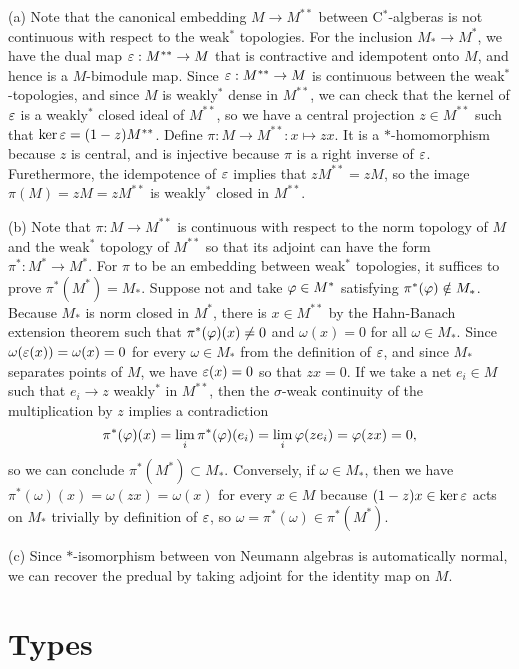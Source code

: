 \documentclass{../../large}
\begin{document}
\begin{pf}
(a)
Note that the canonical embedding $M\to M^{**}$ between C$^*$-algberas is not continuous with respect to the weak$^*$ topologies.
For the inclusion $M_*\to M^*$, we have the dual map $\varepsilon:M^{**}\to M$ that is contractive and idempotent onto $M$, and hence is a $M$-bimodule map.
Since $\varepsilon:M^{**}\to M$ is continuous between the weak$^*$-topologies, and since $M$ is weakly$^*$ dense in $M^{**}$, we can check that the kernel of $\varepsilon$ is a weakly$^*$ closed ideal of $M^{**}$, so we have a central projection $z\in M^{**}$ such that $\ker\varepsilon=(1-z)M^{**}$.
Define $\pi:M\to M^{**}:x\mapsto zx$.
It is a $*$-homomorphism because $z$ is central, and is injective because $\pi$ is a right inverse of $\varepsilon$.
Furethermore, the idempotence of $\varepsilon$ implies that $zM^{**}=zM$, so the image $\pi(M)=zM=zM^{**}$ is weakly$^*$ closed in $M^{**}$.

(b)
Note that $\pi:M\to M^{**}$ is continuous with respect to the norm topology of $M$ and the weak$^*$ topology of $M^{**}$ so that its adjoint can have the form $\pi^*:M^*\to M^*$.
For $\pi$ to be an embedding between weak$^*$ topologies, it suffices to prove $\pi^*(M^*)=M_*$.
Suppose not and take $\varphi\in M^*$ satisfying $\pi^*(\varphi)\notin M_*$.
Because $M_*$ is norm closed in $M^*$, there is $x\in M^{**}$ by the Hahn-Banach extension theorem such that $\pi^*(\varphi)(x)\ne0$ and $\omega(x)=0$ for all $\omega\in M_*$.
Since $\omega(\varepsilon(x))=\omega(x)=0$ for every $\omega\in M_*$ from the definition of $\varepsilon$, and since $M_*$ separates points of $M$, we have $\varepsilon(x)=0$ so that $zx=0$.
If we take a net $e_i\in M$ such that $e_i\to z$ weakly$^*$ in $M^{**}$, then the $\sigma$-weak continuity of the multiplication by $z$ implies a contradiction
\[\pi^*(\varphi)(x)=\lim_i\pi^*(\varphi)(e_i)=\lim_i\varphi(ze_i)=\varphi(zx)=0,\]
so we can conclude $\pi^*(M^*)\subset M_*$.
Conversely, if $\omega\in M_*$, then we have $\pi^*(\omega)(x)=\omega(zx)=\omega(x)$ for every $x\in M$ because $(1-z)x\in\ker\varepsilon$ acts on $M_*$ trivially by definition of $\varepsilon$, so $\omega=\pi^*(\omega)\in\pi^*(M^*)$.

(c)
Since $*$-isomorphism between von Neumann algebras is automatically normal, we can recover the predual by taking adjoint for the identity map on $M$.
\end{pf}


\section{Types}
\end{document}
